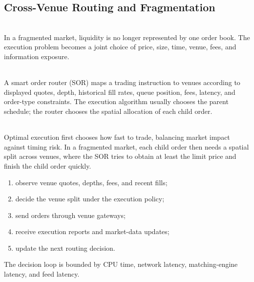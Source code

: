 \subsection{Cross-Venue Routing and Fragmentation}

\begin{principle} \\
In a fragmented market, liquidity is no longer represented by one order book. The execution problem becomes a joint choice of price, size, time, venue, fees, and information exposure.
\end{principle}

\begin{definition} \\
A smart order router (SOR) maps a trading instruction to venues according to displayed quotes, depth, historical fill rates, queue position, fees, latency, and order-type constraints. The execution algorithm usually chooses the parent schedule; the router chooses the spatial allocation of each child order.
\end{definition}

\begin{principle} \\
Optimal execution first chooses how fast to trade, balancing market impact against timing risk. In a fragmented market, each child order then needs a spatial split across venues, where the SOR tries to obtain at least the limit price and finish the child order quickly.
\end{principle}

\begin{process} 
\begin{enumerate}[label=\roman*.]
\setlength{\itemsep}{0pt}
\item observe venue quotes, depths, fees, and recent fills;
\item decide the venue split under the execution policy;
\item send orders through venue gateways;
\item receive execution reports and market-data updates;
\item update the next routing decision.
\end{enumerate}
The decision loop is bounded by CPU time, network latency, matching-engine latency, and feed latency.
\end{process}

